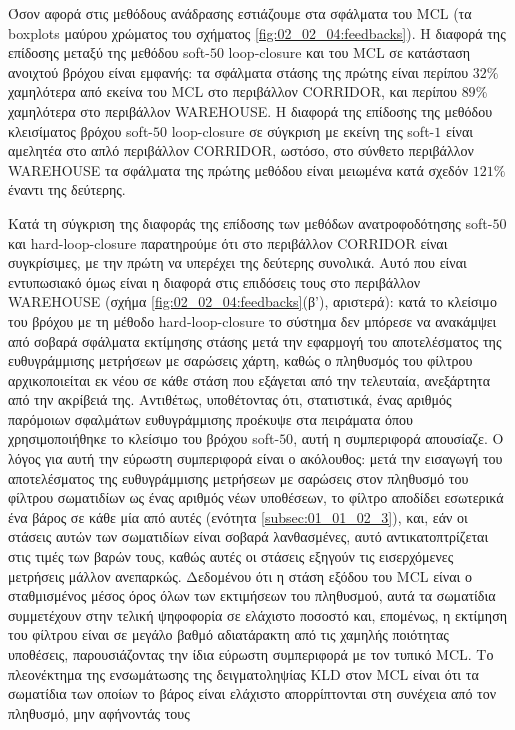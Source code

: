 Όσον αφορά στις μεθόδους ανάδρασης εστιάζουμε στα σφάλματα του MCL (τα
boxplots μαύρου χρώματος του σχήματος \ref{fig:02_02_04:feedbacks}). Η διαφορά
της επίδοσης μεταξύ της μεθόδου soft-$50$ loop-closure και του MCL σε κατάσταση
ανοιχτού βρόχου είναι εμφανής: τα σφάλματα στάσης της πρώτης είναι περίπου
$32\%$ χαμηλότερα από εκείνα του MCL στο περιβάλλον CORRIDOR, και περίπου
$89\%$ χαμηλότερα στο περιβάλλον WAREHOUSE. Η διαφορά της επίδοσης της μεθόδου
κλεισίματος βρόχου soft-$50$ loop-closure σε σύγκριση με εκείνη της soft-$1$
είναι αμελητέα στο απλό περιβάλλον CORRIDOR, ωστόσο, στο σύνθετο περιβάλλον
WAREHOUSE τα σφάλματα της πρώτης μεθόδου είναι μειωμένα κατά σχεδόν $121\%$
έναντι της δεύτερης.

Κατά τη σύγκριση της διαφοράς της επίδοσης των μεθόδων ανατροφοδότησης
soft-$50$ και hard-loop-closure παρατηρούμε ότι στο περιβάλλον CORRIDOR είναι
συγκρίσιμες, με την πρώτη να υπερέχει της δεύτερης συνολικά. Αυτό που είναι
εντυπωσιακό όμως είναι η διαφορά στις επιδόσεις τους στο περιβάλλον WAREHOUSE
(σχήμα \ref{fig:02_02_04:feedbacks}(β'), αριστερά): κατά το κλείσιμο του βρόχου
με τη μέθοδο hard-loop-closure το σύστημα δεν μπόρεσε να ανακάμψει από σοβαρά
σφάλματα εκτίμησης στάσης μετά την εφαρμογή του αποτελέσματος της ευθυγράμμισης
μετρήσεων με σαρώσεις χάρτη, καθώς ο πληθυσμός του φίλτρου αρχικοποιείται εκ
νέου σε κάθε στάση που εξάγεται από την τελευταία, ανεξάρτητα από την ακρίβειά
της. Αντιθέτως, υποθέτοντας ότι, στατιστικά, ένας αριθμός παρόμοιων σφαλμάτων
ευθυγράμμισης προέκυψε στα πειράματα όπου χρησιμοποιήθηκε το κλείσιμο του
βρόχου soft-$50$, αυτή η συμπεριφορά απουσίαζε. Ο λόγος για αυτή την εύρωστη
συμπεριφορά είναι ο ακόλουθος: μετά την εισαγωγή του αποτελέσματος της
ευθυγράμμισης μετρήσεων με σαρώσεις στον πληθυσμό του φίλτρου σωματιδίων ως
ένας αριθμός νέων υποθέσεων, το φίλτρο αποδίδει εσωτερικά ένα βάρος σε κάθε μία
από αυτές (ενότητα \ref{subsec:01_01_02_3}), και, εάν οι στάσεις αυτών των
σωματιδίων είναι σοβαρά λανθασμένες, αυτό αντικατοπτρίζεται στις τιμές των
βαρών τους, καθώς αυτές οι στάσεις εξηγούν τις εισερχόμενες μετρήσεις μάλλον
ανεπαρκώς. Δεδομένου ότι η στάση εξόδου του MCL είναι ο σταθμισμένος μέσος όρος
όλων των εκτιμήσεων του πληθυσμού, αυτά τα σωματίδια συμμετέχουν στην τελική
ψηφοφορία σε ελάχιστο ποσοστό και, επομένως, η εκτίμηση του φίλτρου είναι σε
μεγάλο βαθμό αδιατάρακτη από τις χαμηλής ποιότητας υποθέσεις, παρουσιάζοντας
την ίδια εύρωστη συμπεριφορά με τον τυπικό MCL. Το πλεονέκτημα της ενσωμάτωσης
της δειγματοληψίας KLD στον MCL είναι ότι τα σωματίδια των οποίων το βάρος
είναι ελάχιστο απορρίπτονται στη συνέχεια από τον πληθυσμό, μην αφήνοντάς τους

